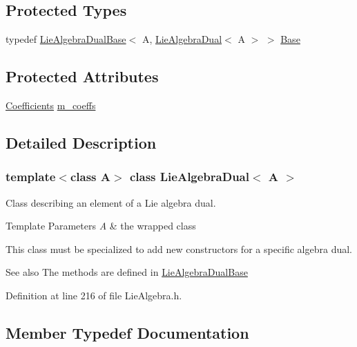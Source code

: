 \subsection*{Protected Types}
\begin{DoxyCompactItemize}
\item 
typedef \hyperlink{class_lie_algebra_dual_base}{Lie\+Algebra\+Dual\+Base}$<$ A, \hyperlink{class_lie_algebra_dual}{Lie\+Algebra\+Dual}$<$ A $>$ $>$ \hyperlink{class_lie_algebra_dual_ac465396ba89ca481f86d1ce4d4e63a46}{Base}
\end{DoxyCompactItemize}
\subsection*{Protected Attributes}
\begin{DoxyCompactItemize}
\item 
\hyperlink{class_lie_algebra_dual_a82710c51eb4d0b6cbd190e76a33fbc17}{Coefficients} \hyperlink{class_lie_algebra_dual_a14e27002abc8d9b40891ff0f613f0546}{m\+\_\+coeffs}
\end{DoxyCompactItemize}


\subsection{Detailed Description}
\subsubsection*{template$<$class A$>$\newline
class Lie\+Algebra\+Dual$<$ A $>$}

Class describing an element of a Lie algebra dual. 


\begin{DoxyTemplParams}{Template Parameters}
{\em A} & the wrapped class\\
\hline
\end{DoxyTemplParams}
This class must be specialized to add new constructors for a specific algebra dual.

\begin{DoxySeeAlso}{See also}
The methods are defined in \hyperlink{class_lie_algebra_dual_base}{Lie\+Algebra\+Dual\+Base} 
\end{DoxySeeAlso}


Definition at line 216 of file Lie\+Algebra.\+h.



\subsection{Member Typedef Documentation}
\hypertarget{class_lie_algebra_dual_ac465396ba89ca481f86d1ce4d4e63a46}{}\label{class_lie_algebra_dual_ac465396ba89ca481f86d1ce4d4e63a46} 

